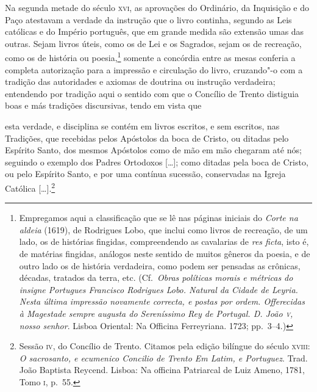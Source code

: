
Na segunda metade do século \textsc{xvi}, as aprovações do Ordinário, da
Inquisição e do Paço atestavam a verdade da instrução que o livro
continha, segundo as Leis católicas e do Império português, que em
grande medida são extensão umas das outras. Sejam livros úteis, como os
de Lei e os Sagrados, sejam os de recreação, como os de história ou
poesia,\footnote{ Empregamos aqui a classificação que se lê nas páginas
iniciais do \textit{Corte na aldeia} (1619), de Rodrigues Lobo, que inclui como
livros de recreação, de um lado, os de histórias fingidas, compreendendo
as cavalarias de \textit{res ficta}, isto é, de matérias fingidas, análogos neste
sentido de muitos gêneros da poesia, e de outro lado os de história
verdadeira, como podem ser pensadas as crônicas, décadas, tratados da
terra, etc. (Cf.~\textit{Obras políticas morais e métricas do insigne Portugues
Francisco Rodrigues Lobo. Natural da Cidade de Leyria. Nesta última
impressão novamente correcta, e postas por ordem. Offerecidas à
Magestade sempre augusta do Sereníssimo Rey de Portugal. D. João \textsc{v},
nosso senhor}. Lisboa Oriental: Na Officina Ferreyriana. 1723;
pp.~3--4.)} somente a concórdia entre as mesas conferia a completa
autorização para a impressão e circulação do livro, cruzando"-o com a
tradição das autoridades e axiomas de doutrina ou instrução verdadeira;
entendendo por tradição aqui o sentido com que o Concílio de Trento
distiguia boas e más tradições discursivas, tendo em vista que 

\begin{hedraquote}
esta verdade, e disciplina se contém em livros escritos, e sem escritos,
nas Tradições, que recebidas pelos Apóstolos da boca de Cristo, ou
ditadas pelo Espírito Santo, dos mesmos Apóstolos como de mão em mão
chegaram até nós; seguindo o exemplo dos Padres Ortodoxos [\ldots{}]; como
ditadas pela boca de Cristo, ou pelo Espírito Santo, e por uma
contínua sucessão, conservadas na Igreja Católica [\ldots{}].\footnote{ Sessão 
\textsc{iv}, do Concílio de Trento. Citamos pela edição bilíngue do
século 	\textsc{xviii}: \textit{O sacrosanto, e ecumenico Concilio de Trento Em Latim, e
Portuguez}. Trad. João Baptista Reycend. Lisboa: Na officina Patriarcal
de Luiz Ameno, 1781, Tomo \textsc{i}, p.~55.}
\end{hedraquote}

